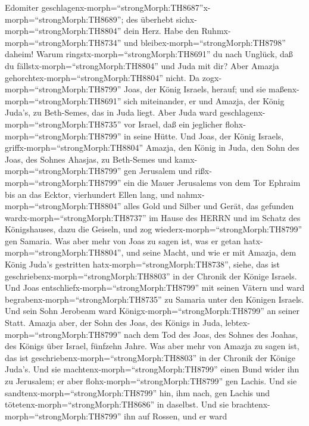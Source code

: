 Edomiter
geschlagenx-morph=``strongMorph:TH8687''x-morph=``strongMorph:TH8689'';
des überhebt sichx-morph=``strongMorph:TH8804'' dein Herz. Habe den
Ruhmx-morph=``strongMorph:TH8734'' und
bleibex-morph=``strongMorph:TH8798'' daheim! Warum
ringstx-morph=``strongMorph:TH8691'' du nach Unglück, daß du
fällstx-morph=``strongMorph:TH8804'' und Juda mit dir? 
Aber Amazja gehorchtex-morph=``strongMorph:TH8804'' nicht. Da
zogx-morph=``strongMorph:TH8799'' Joas, der König Israels, herauf; und
sie maßenx-morph=``strongMorph:TH8691'' sich miteinander, er und Amazja,
der König Juda's, zu Beth-Semes, das in Juda liegt.  Aber
Juda ward geschlagenx-morph=``strongMorph:TH8735'' vor Israel, daß ein
jeglicher flohx-morph=``strongMorph:TH8799'' in seine Hütte.
 Und Joas, der König Israels,
griffx-morph=``strongMorph:TH8804'' Amazja, den König in Juda, den Sohn
des Joas, des Sohnes Ahasjas, zu Beth-Semes und
kamx-morph=``strongMorph:TH8799'' gen Jerusalem und
rißx-morph=``strongMorph:TH8799'' ein die Mauer Jerusalems von dem Tor
Ephraim bis an das Ecktor, vierhundert Ellen lang,  und
nahmx-morph=``strongMorph:TH8804'' alles Gold und Silber und Gerät, das
gefunden wardx-morph=``strongMorph:TH8737'' im Hause des HERRN und im
Schatz des Königshauses, dazu die Geiseln, und zog
wiederx-morph=``strongMorph:TH8799'' gen Samaria.  Was aber
mehr von Joas zu sagen ist, was er getan
hatx-morph=``strongMorph:TH8804'', und seine Macht, und wie er mit
Amazja, dem König Juda's gestritten hatx-morph=``strongMorph:TH8738'',
siehe, das ist geschriebenx-morph=``strongMorph:TH8803'' in der Chronik
der Könige Israels.  Und Joas
entschliefx-morph=``strongMorph:TH8799'' mit seinen Vätern und ward
begrabenx-morph=``strongMorph:TH8735'' zu Samaria unter den Königen
Israels. Und sein Sohn Jerobeam ward Königx-morph=``strongMorph:TH8799''
an seiner Statt.  Amazja aber, der Sohn des Joas, des
Königs in Juda, lebtex-morph=``strongMorph:TH8799'' nach dem Tod des
Joas, des Sohnes des Joahas, des Königs über Israel, fünfzehn Jahre.
 Was aber mehr von Amazja zu sagen ist, das ist
geschriebenx-morph=``strongMorph:TH8803'' in der Chronik der Könige
Juda's.  Und sie machtenx-morph=``strongMorph:TH8799''
einen Bund wider ihn zu Jerusalem; er aber
flohx-morph=``strongMorph:TH8799'' gen Lachis. Und sie
sandtenx-morph=``strongMorph:TH8799'' hin, ihm nach, gen Lachis und
tötetenx-morph=``strongMorph:TH8686'' in daselbst.  Und sie
brachtenx-morph=``strongMorph:TH8799'' ihn auf Rossen, und er ward
